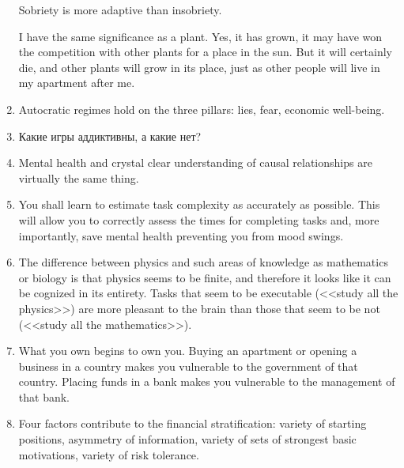 \documentclass[11pt]{article}
\theoremstyle{remark}
\theoremstyle{definition}
\begin{document}
\begin{enumerate}
Sobriety is more adaptive than insobriety. 

I have the same significance as a plant. Yes, it has grown, it may have won the competition with other plants for a place in the sun. But it will certainly die, and other plants will grow in its place, just as other people will live in my apartment after me.

\item Autocratic regimes hold on the three pillars: lies, fear, economic well-being.

\item Какие игры аддиктивны, а какие нет?





\item Mental health and crystal clear understanding of causal relationships are virtually the same thing.

\item You shall learn to estimate task complexity as accurately as possible. This will allow you to correctly assess the times for completing tasks and, more importantly, save mental health preventing you from mood swings.
 
\item The difference between physics and such areas of knowledge as mathematics or biology is that physics seems to be finite, and therefore it looks like it can be cognized in its entirety. Tasks that seem to be executable (<<study all the physics>>) are more pleasant to the brain than those that seem to be not (<<study all the mathematics>>).

\item What you own begins to own you. Buying an apartment or opening a business in a country makes you vulnerable to the government of that country. Placing funds in a bank makes you vulnerable to the management of that bank.

\item Four factors contribute to the financial stratification: variety of starting positions, asymmetry of information, variety of sets of strongest basic motivations, variety of risk tolerance.




\end{enumerate}
\end{document}

